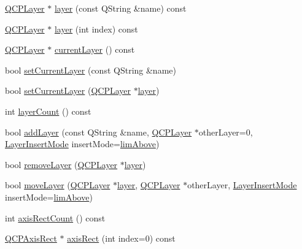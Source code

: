 \begin{DoxyCompactItemize}
\item 
\hyperlink{class_q_c_p_layer}{Q\+C\+P\+Layer} $\ast$ \hyperlink{class_q_custom_plot_aac492da01782820454e9136a8db28182}{layer} (const Q\+String \&name) const 
\item 
\hyperlink{class_q_c_p_layer}{Q\+C\+P\+Layer} $\ast$ \hyperlink{class_q_custom_plot_a1e73051e371f1815b48d8b355be0d2ab}{layer} (int index) const 
\item 
\hyperlink{class_q_c_p_layer}{Q\+C\+P\+Layer} $\ast$ \hyperlink{class_q_custom_plot_af73057345656cbd1463454982d808b00}{current\+Layer} () const 
\item 
bool \hyperlink{class_q_custom_plot_a73a6dc47c653bb6f8f030abca5a11852}{set\+Current\+Layer} (const Q\+String \&name)
\item 
bool \hyperlink{class_q_custom_plot_a23a4d3cadad1a0063c5fe19aac5659e6}{set\+Current\+Layer} (\hyperlink{class_q_c_p_layer}{Q\+C\+P\+Layer} $\ast$\hyperlink{class_q_custom_plot_aac492da01782820454e9136a8db28182}{layer})
\item 
int \hyperlink{class_q_custom_plot_a1b3926884f5bd4bdda1495d8b3c891d0}{layer\+Count} () const 
\item 
bool \hyperlink{class_q_custom_plot_ad5255393df078448bb6ac83fa5db5f52}{add\+Layer} (const Q\+String \&name, \hyperlink{class_q_c_p_layer}{Q\+C\+P\+Layer} $\ast$other\+Layer=0, \hyperlink{class_q_custom_plot_a75a8afbe6ef333b1f3d47abb25b9add7}{Layer\+Insert\+Mode} insert\+Mode=\hyperlink{class_q_custom_plot_a75a8afbe6ef333b1f3d47abb25b9add7a062b0b7825650b432a713c0df6742d41}{lim\+Above})
\item 
bool \hyperlink{class_q_custom_plot_a40f75e342c5eaab6a86066a42a0e2a94}{remove\+Layer} (\hyperlink{class_q_c_p_layer}{Q\+C\+P\+Layer} $\ast$\hyperlink{class_q_custom_plot_aac492da01782820454e9136a8db28182}{layer})
\item 
bool \hyperlink{class_q_custom_plot_ae896140beff19424e9e9e02d6e331104}{move\+Layer} (\hyperlink{class_q_c_p_layer}{Q\+C\+P\+Layer} $\ast$\hyperlink{class_q_custom_plot_aac492da01782820454e9136a8db28182}{layer}, \hyperlink{class_q_c_p_layer}{Q\+C\+P\+Layer} $\ast$other\+Layer, \hyperlink{class_q_custom_plot_a75a8afbe6ef333b1f3d47abb25b9add7}{Layer\+Insert\+Mode} insert\+Mode=\hyperlink{class_q_custom_plot_a75a8afbe6ef333b1f3d47abb25b9add7a062b0b7825650b432a713c0df6742d41}{lim\+Above})
\item 
int \hyperlink{class_q_custom_plot_a340fa24b1607e445cedda9685670ead3}{axis\+Rect\+Count} () const 
\item 
\hyperlink{class_q_c_p_axis_rect}{Q\+C\+P\+Axis\+Rect} $\ast$ \hyperlink{class_q_custom_plot_a4a37a1add5fe63060ac518cf0a4c4050}{axis\+Rect} (int index=0) const 

\end{DoxyCompactItemize}
